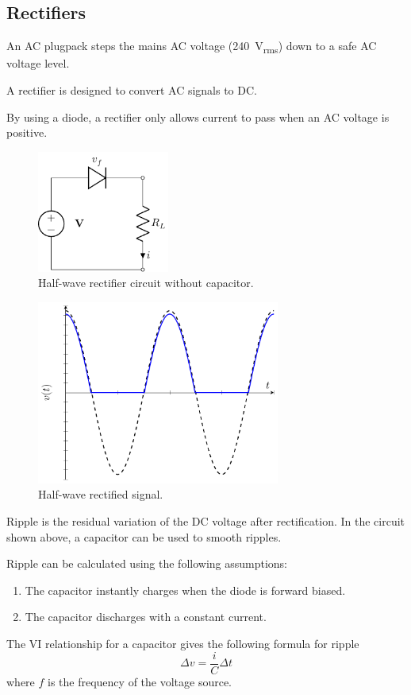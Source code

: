 \documentclass{article}
\begin{document}
\subsection{Rectifiers}
\begin{definition}[Plugpack]
    An AC plugpack steps the mains AC voltage (\qty{240}{V_{rms}}) down to a safe AC voltage level.
\end{definition}
\begin{definition}[Rectifier]
    A rectifier is designed to convert AC signals to DC\@.
\end{definition}
By using a diode, a rectifier only allows current to pass when an AC
voltage is positive.
\begin{figure}[H]
    \centering
    \includegraphics[height = 4cm, keepaspectratio = true]{figures/half_wave_rectifier_without_capacitor.pdf}
    \caption{Half-wave rectifier circuit without capacitor.}
\end{figure}
\begin{figure}[H]
    \centering
    \includegraphics[width = 8cm, keepaspectratio = true]{figures/half_wave_rectifier_without_capacitor_plot.pdf}
    \caption{Half-wave rectified signal.}
\end{figure}
\begin{definition}[Ripple]
    Ripple is the residual variation of the DC voltage after rectification.
    In the circuit shown above, a capacitor can be used to smooth ripples.

    Ripple can be calculated using the following assumptions:
    \begin{enumerate}
        \item The capacitor instantly charges when the diode is forward biased.
        \item The capacitor discharges with a constant current.
    \end{enumerate}
    The VI relationship for a capacitor gives the following formula for ripple
    \begin{equation*}
        \Delta v = \frac{i}{C} \Delta t
    \end{equation*}
    where \(f\) is the frequency of the voltage source.
\end{definition}
\end{document}
